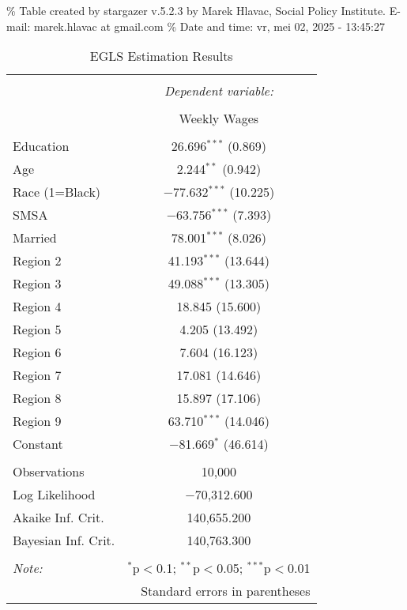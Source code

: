\documentclass[
]{article}
\begin{document}
\% Table created by stargazer v.5.2.3 by Marek Hlavac, Social Policy
Institute. E-mail: marek.hlavac at gmail.com \% Date and time: vr, mei
02, 2025 - 13:45:27

\begin{table}[!htbp] \centering 
  \caption{EGLS Estimation Results} 
  \label{} 
\begin{tabular}{@{\extracolsep{1pt}}lc} 
\\[-1.8ex]\hline 
\hline \\[-1.8ex] 
 & \multicolumn{1}{c}{\textit{Dependent variable:}} \\ 
\cline{2-2} 
\\[-1.8ex] & Weekly Wages \\ 
\hline \\[-1.8ex] 
 Education & 26.696$^{***}$ (0.869) \\ 
  Age & 2.244$^{**}$ (0.942) \\ 
  Race (1=Black) & $-$77.632$^{***}$ (10.225) \\ 
  SMSA & $-$63.756$^{***}$ (7.393) \\ 
  Married & 78.001$^{***}$ (8.026) \\ 
  Region 2 & 41.193$^{***}$ (13.644) \\ 
  Region 3 & 49.088$^{***}$ (13.305) \\ 
  Region 4 & 18.845 (15.600) \\ 
  Region 5 & 4.205 (13.492) \\ 
  Region 6 & 7.604 (16.123) \\ 
  Region 7 & 17.081 (14.646) \\ 
  Region 8 & 15.897 (17.106) \\ 
  Region 9 & 63.710$^{***}$ (14.046) \\ 
  Constant & $-$81.669$^{*}$ (46.614) \\ 
 \hline \\[-1.8ex] 
Observations & 10,000 \\ 
Log Likelihood & $-$70,312.600 \\ 
Akaike Inf. Crit. & 140,655.200 \\ 
Bayesian Inf. Crit. & 140,763.300 \\ 
\hline 
\hline \\[-1.8ex] 
\textit{Note:}  & \multicolumn{1}{r}{$^{*}$p$<$0.1; $^{**}$p$<$0.05; $^{***}$p$<$0.01} \\ 
 & \multicolumn{1}{r}{Standard errors in parentheses} \\ 
\end{tabular} 
\end{table}
\end{document}
